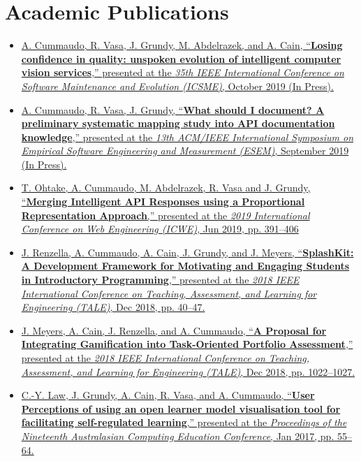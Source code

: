 \section{Academic Publications}

\medskip
{
\footnotesize
\begin{itemize}
  \item \href{http://arxiv.org/abs/1906.07328}{A. Cummaudo, R. Vasa, J. Grundy, M. Abdelrazek, and A. Cain, ``\textbf{Losing confidence in quality: unspoken evolution of intelligent computer vision services},” presented at the \textit{35th IEEE International Conference on Software Maintenance and Evolution (ICSME)}, October 2019 (In Press).}\\
  \item \href{https://arxiv.org/abs/1907.13260}{A. Cummaudo, R. Vasa, J. Grundy, ``\textbf{What should I document? A preliminary systematic mapping study into API documentation knowledge},” presented at the \textit{13th ACM/IEEE International Symposium on Empirical Software Engineering and Measurement (ESEM)}, September 2019 (In Press).}\\
  \item \href{https://doi.org/10.1007/978-3-030-19274-7_28}{T. Ohtake, A. Cummaudo, M. Abdelrazek, R. Vasa and J. Grundy, ``\textbf{Merging Intelligent API Responses using a Proportional Representation Approach},'' presented at the \textit{2019 International Conference on Web Engineering (ICWE)}, Jun 2019, pp. 391--406}\\
  \item \href{http://doi.org/10.1109/TALE.2018.8615203}{J. Renzella, A. Cummaudo, A. Cain, J. Grundy, and J. Meyers, ``\textbf{SplashKit: A Development Framework for Motivating and Engaging Students in Introductory Programming},'' presented at the \textit{2018 IEEE International Conference on Teaching, Assessment, and Learning for Engineering (TALE)}, Dec 2018, pp. 40--47.}\\
  \item \href{http://doi.org/10.1109/TALE.2018.8615174}{J. Meyers, A. Cain, J. Renzella, and A. Cummaudo, ``\textbf{A Proposal for Integrating Gamification into Task-Oriented Portfolio Assessment},'' presented at the \textit{2018 IEEE International Conference on Teaching, Assessment, and Learning for Engineering (TALE)}, Dec 2018, pp. 1022--1027.}\\
  \item \href{http://doi.org/10.1145/3013499.3013502}{C.-Y. Law, J. Grundy, A. Cain, R. Vasa, and A. Cummaudo, ``\textbf{User Perceptions of using an open learner model visualisation tool for facilitating self-regulated learning},'' presented at the \textit{Proceedings of the Nineteenth Australasian Computing Education Conference}, Jan 2017, pp. 55--64.}
\end{itemize}
}

